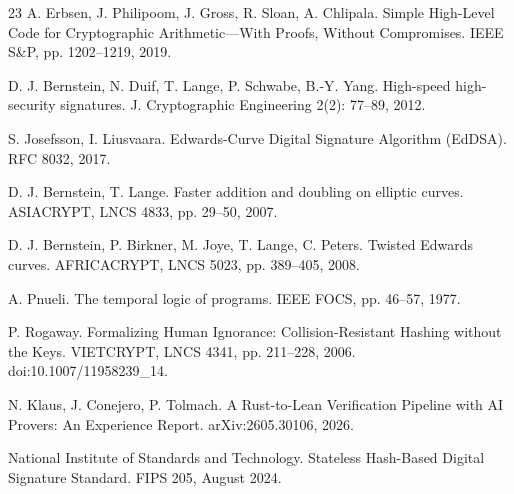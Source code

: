 \documentclass[11pt]{article}
\theoremstyle{remark}
\begin{document}
\begin{thebibliography}{23}
 A. Erbsen, J. Philipoom, J. Gross, R. Sloan,
A. Chlipala. Simple High-Level Code for Cryptographic Arithmetic---With
Proofs, Without Compromises. IEEE S\&P, pp. 1202--1219, 2019.

 D. J. Bernstein, N. Duif, T. Lange, P. Schwabe, B.-Y. Yang.
High-speed high-security signatures. J. Cryptographic Engineering 2(2):
77--89, 2012.

 S. Josefsson, I. Liusvaara. Edwards-Curve Digital
Signature Algorithm (EdDSA). RFC 8032, 2017.

 D. J. Bernstein, T. Lange. Faster addition and doubling on
elliptic curves. ASIACRYPT, LNCS 4833, pp. 29--50, 2007.

 D. J. Bernstein, P. Birkner, M. Joye, T. Lange,
C. Peters. Twisted Edwards curves. AFRICACRYPT, LNCS 5023, pp. 389--405,
2008.

 A. Pnueli. The temporal logic of programs. IEEE FOCS, pp.
46--57, 1977.


 P. Rogaway. Formalizing Human Ignorance:
Collision-Resistant Hashing without the Keys. VIETCRYPT, LNCS 4341, pp.
211--228, 2006. doi:10.1007/11958239\_14.

 N. Klaus, J. Conejero, P. Tolmach. A Rust-to-Lean
Verification Pipeline with AI Provers: An Experience Report. arXiv:2605.30106,
2026.

 National Institute of Standards and Technology.
Stateless Hash-Based Digital Signature Standard. FIPS 205, August 2024.

\end{thebibliography}

\clearpage
\appendix
\end{document}
